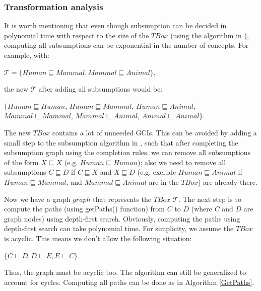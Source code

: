 \documentclass{sfuthesis}
\theoremstyle{plain}
\theoremstyle{definition}
\begin{document}
\subsubsection{Transformation analysis}
It is worth mentioning that even though subsumption can be decided in polynomial time with respect to the size of the $TBox$ (using the algorithm in \cite{small}), computing all subsumptions can be exponential in the number of concepts. For example, with:
\begin{center} 
$\mathcal{T} = \{Human \sqsubseteq Mammal, Mammal \sqsubseteq Animal\}$, 
\end{center}
the new $\mathcal{T}$ after adding all subsumptions would be: 
\begin{center}
$\{Human \sqsubseteq Human$, $Human \sqsubseteq Mammal$, $Human \sqsubseteq Animal$, $Mammal \sqsubseteq Mammal$, $Mammal \sqsubseteq Animal$, $Animal \sqsubseteq Animal\}$. 
\end{center}
The new $TBox$ contains a lot of unneeded GCIs. This can be avoided by adding a small step to the subsumption algorithm in \cite{small}, such that after completing the subsumption graph using the completion rules, we can remove all subsumptions of the form $X \sqsubseteq X$ (e.g. $Human \sqsubseteq Human$); also we need to remove all subsumptions $C \sqsubseteq D$ if $C \sqsubseteq X$ and $X \sqsubseteq D$ (e.g. exclude $Human \sqsubseteq Animal$ if $Human \sqsubseteq Mammal$, and $Mammal \sqsubseteq Animal$ are in the $TBox$) are already there.

Now we have a graph $graph$ that represents the $TBox$ $\mathcal{T}$. The next step is to compute the paths (using getPaths() function) from $C$ to $D$ (where $C$ and $D$ are graph nodes) using depth-first search. Obviously, computing the paths using depth-first search can take polynomial time. For simplicity, we assume the $TBox$ is acyclic. This means we don't allow the following situation:
\begin{center}
$\lbrace C \sqsubseteq D , D \sqsubseteq E , E \sqsubseteq C \rbrace$.
\end{center}
Thus, the graph must be acyclic too. The algorithm can still be generalized to account for cycles. Computing all paths can be done as in Algorithm \ref{GetPaths}.
\end{document}
